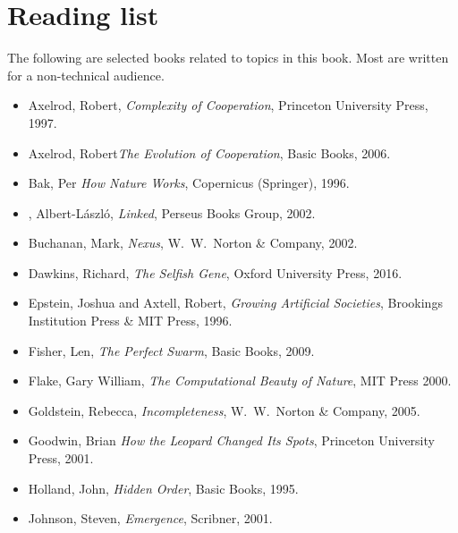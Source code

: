 \documentclass[12pt]{book}
\theoremstyle{exercise}
\begin{document}
\appendix

\chapter{Reading list}
\label{reading}

The following are selected books related to topics in this book.  Most are written for a non-technical audience.


\begin{itemize}

\item Axelrod, Robert,  {\it  Complexity of Cooperation},
Princeton University Press, 1997.

\item Axelrod, Robert{\it  The Evolution of Cooperation},
Basic Books, 2006.

\item Bak, Per {\it  How Nature Works},
Copernicus (Springer), 1996.

\item \Barabasi, Albert-L\'{a}szl\'{o}, {\it  Linked},
Perseus Books Group, 2002.

\item Buchanan, Mark, {\it  Nexus},
W.~W.~Norton \& Company, 2002.

\item Dawkins, Richard, {\it The Selfish Gene},
Oxford University Press, 2016.

\item Epstein, Joshua and Axtell, Robert, {\it  Growing Artificial Societies},
Brookings Institution Press \& MIT Press, 1996.

\item Fisher, Len, {\it  The Perfect Swarm},
Basic Books, 2009.

\item Flake, Gary William, {\it  The Computational Beauty of Nature},
MIT Press 2000.

\item Goldstein, Rebecca, {\it Incompleteness},
W.~W.~Norton \& Company, 2005.

\item Goodwin, Brian {\it  How the Leopard Changed Its Spots},
Princeton University Press, 2001.

\item Holland, John, {\it  Hidden Order},
Basic Books, 1995.

\item Johnson, Steven, {\it  Emergence},
Scribner, 2001.


\end{itemize}
\end{document}

